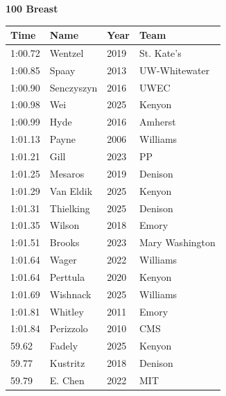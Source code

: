 \noindent\begin{minipage}[t]{0.98\textwidth}
\centering
\textbf{\textcolor{teamprimary}{100 Breast}}\par
\vspace{0.5em}
\centering
\small
\renewcommand{\arraystretch}{1.0}
\setlength{\tabcolsep}{4pt}
\begin{tabular}{@{}p{2.5cm}p{4.5cm}p{1.5cm}p{2.5cm}@{}}
\toprule
\textbf{Time} & \textbf{Name} & \textbf{Year} & \textbf{Team} \\
\midrule
1:00.72 & Wentzel & 2019 & St. Kate's \\
1:00.85 & Spaay & 2013 & UW-Whitewater \\
1:00.90 & Senczyszyn & 2016 & UWEC \\
1:00.98 & Wei & 2025 & Kenyon \\
1:00.99 & Hyde & 2016 & Amherst \\
1:01.13 & Payne & 2006 & Williams \\
1:01.21 & Gill & 2023 & PP \\
1:01.25 & Mesaros & 2019 & Denison \\
1:01.29 & Van Eldik & 2025 & Kenyon \\
1:01.31 & Thielking & 2025 & Denison \\
1:01.35 & Wilson & 2018 & Emory \\
1:01.51 & Brooks & 2023 & Mary Washington \\
1:01.64 & Wager & 2022 & Williams \\
1:01.64 & Perttula & 2020 & Kenyon \\
1:01.69 & Wishnack & 2025 & Williams \\
1:01.81 & Whitley & 2011 & Emory \\
1:01.84 & Perizzolo & 2010 & CMS \\
59.62 & Fadely & 2025 & Kenyon \\
59.77 & Kustritz & 2018 & Denison \\
59.79 & E. Chen & 2022 & MIT \\
\bottomrule
\end{tabular}
\end{minipage}
\vspace{1.2em}
